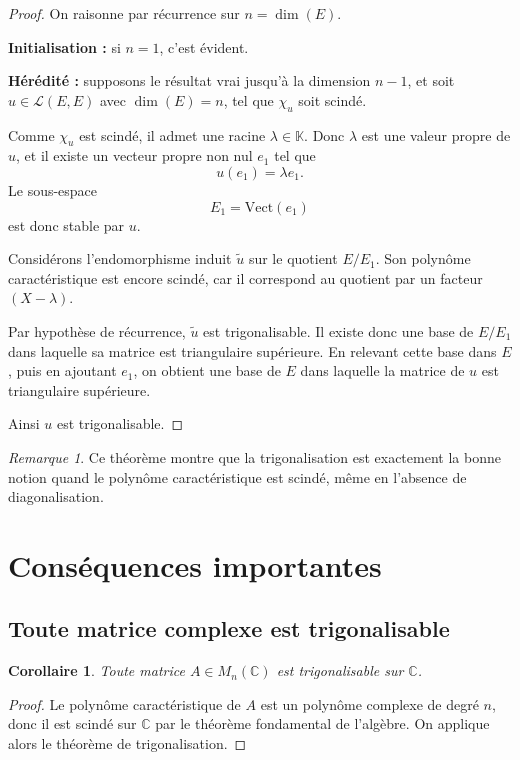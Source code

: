 \documentclass[11pt,a4paper]{article}
\newtheorem{corollaire}[definition]{Corollaire}
\theoremstyle{remark}
\newtheorem{remarque}[definition]{Remarque}
\newcommand{\C}{\mathbb{C}}
\newcommand{\K}{\mathbb{K}}
\newcommand{\Vect}{\mathrm{Vect}}
\begin{document}
\begin{proof}
On raisonne par récurrence sur \(n=\dim(E)\).

\textbf{Initialisation :} si \(n=1\), c’est évident.

\textbf{Hérédité :} supposons le résultat vrai jusqu’à la dimension \(n-1\), et soit \(u\in \mathcal L(E,E)\) avec \(\dim(E)=n\), tel que \(\chi_u\) soit scindé.

Comme \(\chi_u\) est scindé, il admet une racine \(\lambda\in\K\). Donc \(\lambda\) est une valeur propre de \(u\), et il existe un vecteur propre non nul \(e_1\) tel que
\[
u(e_1)=\lambda e_1.
\]
Le sous-espace
\[
E_1=\Vect(e_1)
\]
est donc stable par \(u\).

Considérons l’endomorphisme induit \(\widetilde u\) sur le quotient \(E/E_1\). Son polynôme caractéristique est encore scindé, car il correspond au quotient par un facteur \((X-\lambda)\).

Par hypothèse de récurrence, \(\widetilde u\) est trigonalisable. Il existe donc une base de \(E/E_1\) dans laquelle sa matrice est triangulaire supérieure. En relevant cette base dans \(E\), puis en ajoutant \(e_1\), on obtient une base de \(E\) dans laquelle la matrice de \(u\) est triangulaire supérieure.

Ainsi \(u\) est trigonalisable.
\end{proof}

\begin{remarque}
Ce théorème montre que la trigonalisation est exactement la bonne notion quand le polynôme caractéristique est scindé, même en l’absence de diagonalisation.
\end{remarque}

\section{Conséquences importantes}

\subsection{Toute matrice complexe est trigonalisable}

\begin{corollaire}
Toute matrice \(A\in M_n(\C)\) est trigonalisable sur \(\C\).
\end{corollaire}

\begin{proof}
Le polynôme caractéristique de \(A\) est un polynôme complexe de degré \(n\), donc il est scindé sur \(\C\) par le théorème fondamental de l’algèbre. On applique alors le théorème de trigonalisation.
\end{proof}
\end{document}

